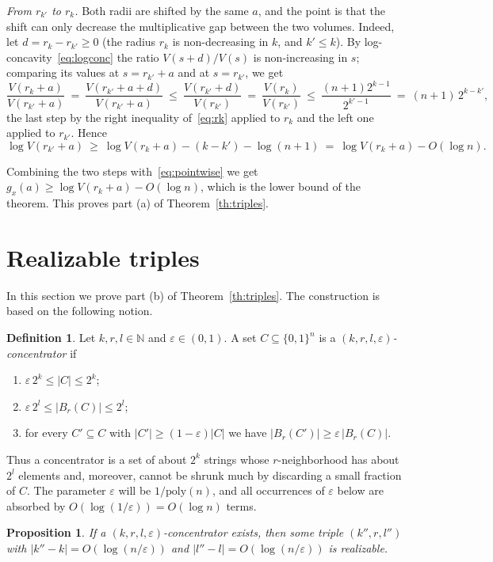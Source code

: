 \documentclass[11pt,a4paper]{article}
\newtheorem{proposition}[theorem]{Proposition}
\theoremstyle{definition}
\newtheorem{definition}[theorem]{Definition}
\newcommand{\N}{\mathbb{N}}
\newcommand{\eps}{\varepsilon}
\renewcommand{\le}{\leqslant}
\renewcommand{\ge}{\geqslant}
\begin{document}
\emph{From $r_{k'}$ to $r_k$.} Both radii are shifted by the same $a$, and the
point is that the shift can only decrease the multiplicative gap between the
two volumes. Indeed, let $d=r_k-r_{k'}\ge0$ (the radius $r_k$ is non-decreasing
in $k$, and $k'\le k$). By log-concavity~\eqref{eq:logconc} the ratio
$V(s+d)/V(s)$ is non-increasing in $s$; comparing its values at $s=r_{k'}+a$
and at $s=r_{k'}$, we get
\[
  \frac{V(r_k+a)}{V(r_{k'}+a)}\ =\ \frac{V(r_{k'}+a+d)}{V(r_{k'}+a)}\ \le\
  \frac{V(r_{k'}+d)}{V(r_{k'})}\ =\ \frac{V(r_k)}{V(r_{k'})}\ \le\
  \frac{(n+1)2^{k-1}}{2^{k'-1}}\ =\ (n+1)\,2^{k-k'} ,
\]
the last step by the right inequality of~\eqref{eq:rk} applied to $r_k$ and the
left one applied to $r_{k'}$. Hence
\[
  \log V(r_{k'}+a)\ \ge\ \log V(r_k+a)-(k-k')-\log(n+1)\ =\
  \log V(r_k+a)-O(\log n) .
\]

Combining the two steps with~\eqref{eq:pointwise} we get
$g_x(a)\ge\log V(r_k+a)-O(\log n)$, which is the lower bound of the theorem.
This proves part (a) of Theorem~\ref{th:triples}.

\section{Realizable triples}\label{sec:triples}

In this section we prove part (b) of Theorem~\ref{th:triples}. The construction
is based on the following notion.

\begin{definition}
Let $k,r,l\in\N$ and $\eps\in(0,1)$. A set $C\subseteq\{0,1\}^n$ is a
\emph{$(k,r,l,\eps)$-concentrator} if
\begin{enumerate}
\item[(C1)] $\eps\,2^{k}\le|C|\le 2^{k}$;
\item[(C2)] $\eps\,2^{l}\le|B_r(C)|\le 2^{l}$;
\item[(C3)] for every $C'\subseteq C$ with $|C'|\ge(1-\eps)|C|$ we have
  $|B_r(C')|\ge\eps\,|B_r(C)|$.
\end{enumerate}
\end{definition}

Thus a concentrator is a set of about $2^k$ strings whose $r$-neighborhood has
about $2^l$ elements and, moreover, cannot be shrunk much by discarding a small
fraction of $C$. The parameter $\eps$ will be $1/\mathrm{poly}(n)$, and all
occurrences of $\eps$ below are absorbed by $O(\log(1/\eps))=O(\log n)$ terms.

\begin{proposition}\label{prop:conc}
If a $(k,r,l,\eps)$-concentrator exists, then some triple $(k'',r,l'')$ with
$|k''-k|=O(\log(n/\eps))$ and $|l''-l|=O(\log(n/\eps))$ is realizable.
\end{proposition}
\end{document}
